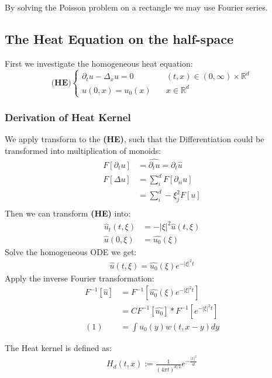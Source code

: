 \begin{remark}
By solving the Poisson problem on a rectangle we may use Fourier series.
\end{remark}


\subsection{The Heat Equation on the  half-space}
First we investigate the homogeneous heat equation:
\begin{equation} 
\textbf{(HE)}\left\{
\begin{aligned}
	\partial_t u - \Delta_x u = 0 \quad &(t, x) \in (0, \infty) \times \mathbb{R}^d\\
	u(0, x) = u_0(x) \quad &x \in \mathbb{R}^d
\end{aligned}
\right.	
\end{equation}


\subsubsection*{Derivation of Heat Kernel}
We apply transform to the \textbf{(HE)}, such that the Differentiation could be transformed into multiplication of monoids:
\begin{align*}
	F[\partial_t u] &= \hat{\partial_t u} = \partial_t \hat{u} \\
	F[\Delta u] &= \sum_i^d F[\partial_{ii} u]\\
	&= \sum_i^d -\xi_j^2 F[u]\\
\end{align*}
Then we can transform \textbf{(HE)} into:
\begin{align*}
	\hat{u}_t(t, \xi) &= -|\xi|^2 \hat{u}(t, \xi) \\
	\hat{u}(0, \xi) &= \hat{u_0}(\xi)
\end{align*}
Solve the homogeneous ODE we get:
\begin{align*}
	\hat{u}(t, \xi) = \hat{u_0}(\xi) e^{-|\xi|^2t}
\end{align*}
Apply the inverse Fourier transformation:
\begin{align*}
	F^{-1}[\hat{u}] &= F^{-1}[\hat{u_0}(\xi) e^{-|\xi|^2t}]\\
	&= C F^{-1}[\hat{u_0}] * F^{-1}[e^{-|\xi|^2 t}]\\
	(1)&= \int u_0(y)w(t, x-y)dy
\end{align*}

\begin{definition}	
The Heat kernel is defined as:
\begin{align*}
	H_d(t, x) := \frac{1}{(4\pi t)^{d/2}} e^{-\frac{|x|^2}{4t}}
\end{align*}
\end{definition}

